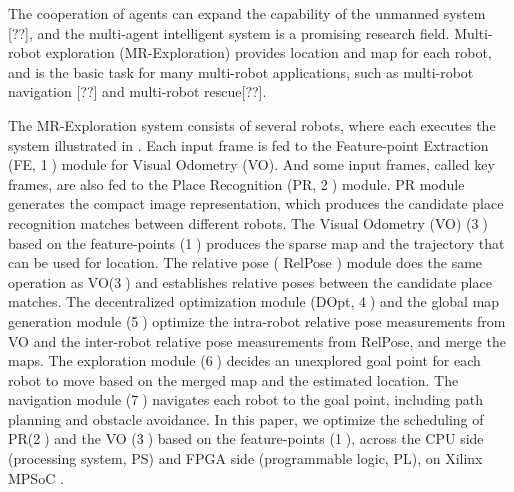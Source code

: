 \label{sec:intro}

The cooperation of agents can expand the capability of the unmanned system [??], and the multi-agent intelligent system is a promising research field.
Multi-robot exploration (MR-Exploration) \cite{corah2019communication} provides location and map for each robot, and is the basic task for many multi-robot applications, such as multi-robot navigation [??] and multi-robot rescue[??].

The  MR-Exploration system \cite{corah2019communication, cieslewski2018data} consists of several robots, where each executes the system illustrated in . Each input frame is fed to the Feature-point Extraction (FE, \textcircled{1}) module for Visual Odometry (VO). 
And some input frames, called key frames, are also fed to the Place Recognition (PR, \textcircled{2}) module.
PR module generates the compact image representation, which produces the candidate place recognition matches between different robots. The  Visual Odometry (VO) (\textcircled{3}) based on the feature-points (\textcircled{1}) produces the sparse map and the trajectory that can be used for location. The relative pose ( RelPose ) module does the same operation as VO(\textcircled{3}) and establishes relative poses between the candidate place matches. The decentralized optimization module (DOpt, \textcircled{4}) and the global map generation module (\textcircled{5}) optimize the intra-robot relative pose measurements from VO and the inter-robot relative pose measurements from RelPose, and merge the maps. The exploration module (\textcircled{6}) decides an unexplored goal point for each robot to move based on the merged map and the estimated location. The navigation module (\textcircled{7}) navigates each robot to the goal point, including path planning and obstacle avoidance.
In this paper, we optimize the scheduling of PR(\textcircled{2}) and the VO (\textcircled{3}) based on the feature-points (\textcircled{1}), across the CPU side (processing system, PS) and FPGA side (programmable logic, PL), on Xilinx MPSoC \cite{MPSoC}.


